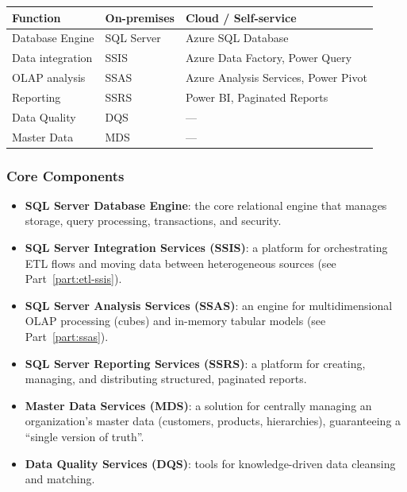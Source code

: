 {
\scriptsize
\begin{center}
\begin{tabular}{@{}lll@{}}
\toprule
\textbf{Function} & \textbf{On-premises} & \textbf{Cloud / Self-service} \\
\midrule
Database Engine & SQL Server & Azure SQL Database \\
Data integration & SSIS & Azure Data Factory, Power Query \\
OLAP analysis & SSAS & Azure Analysis Services, Power Pivot \\
Reporting & SSRS & Power BI, Paginated Reports \\
Data Quality & DQS & --- \\
Master Data & MDS & --- \\
\bottomrule
\end{tabular}
\end{center}
}

\subsubsection{Core Components}
\label{subsec:sql-server-components}

\begin{itemize}
    \item \textbf{SQL Server Database Engine}: the core relational engine that manages storage, query processing, transactions, and security.

    \item \textbf{SQL Server Integration Services (SSIS)}: a platform for orchestrating ETL flows and moving data between heterogeneous sources (see Part~\ref{part:etl-ssis}).

    \item \textbf{SQL Server Analysis Services (SSAS)}: an engine for multidimensional OLAP processing (cubes) and in-memory tabular models (see Part~\ref{part:ssas}).

    \item \textbf{SQL Server Reporting Services (SSRS)}: a platform for creating, managing, and distributing structured, paginated reports.

    \item \textbf{Master Data Services (MDS)}: a solution for centrally managing an organization's master data (customers, products, hierarchies), guaranteeing a ``single version of truth''.

    \item \textbf{Data Quality Services (DQS)}: tools for knowledge-driven data cleansing and matching.
\end{itemize}


